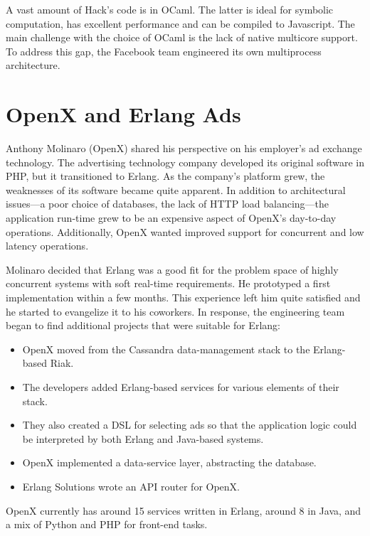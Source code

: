\documentclass{jfp1}
\begin{document}
A vast amount of Hack's code is in OCaml. The latter is ideal for symbolic
computation, has excellent performance and can be compiled to Javascript.
The main challenge with the choice of OCaml is the lack of native
multicore support. To address this gap, the Facebook team engineered its
own multiprocess architecture.

\section{OpenX and Erlang Ads}


Anthony Molinaro (OpenX) shared his perspective on his employer's ad
exchange technology.  The advertising technology company developed its
original software in PHP, but it transitioned to Erlang.  As the company's
platform grew, the weaknesses of its software became quite apparent. In
addition to architectural issues---a poor choice of databases, the lack of
HTTP load balancing---the application run-time grew to be an expensive
aspect of OpenX's day-to-day operations. Additionally, OpenX wanted
improved support for concurrent and low latency operations.

Molinaro decided that Erlang was a good fit for the problem space of
highly concurrent systems with soft real-time requirements. He prototyped
a first implementation within a few months. This experience left him quite
satisfied and he started to evangelize it to his coworkers.  In response,
the engineering team began to find additional projects that were suitable
for Erlang:
\begin{itemize}

\item OpenX moved from the Cassandra data-management stack to the
Erlang-based Riak.

\item The developers added Erlang-based services for various elements of
their stack.

\item They also created a DSL for selecting ads so that the application
logic could be interpreted by both Erlang and Java-based systems.

\item OpenX implemented a data-service layer, abstracting the database.

\item Erlang Solutions wrote an API router for OpenX.
\end{itemize}
%
OpenX currently has around 15 services written in Erlang, around 8 in
Java, and a mix of Python and PHP for front-end tasks.
\end{document}
